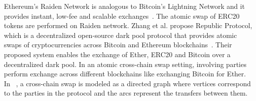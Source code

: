 Ethereum’s Raiden Network is analogous to Bitcoin’s Lightning Network and it provides instant, low-fee and scalable exchanges~\cite{Raiden}. The atomic swap of ERC20 tokens are performed on Raiden network.%
Zhang et al. propose Republic Protocol, which is a decentralized open-source dark pool protocol that provides atomic swaps of cryptocurrencies across Bitcoin and Ethereum blockchains~\cite{zhang2017republic}.%
Their proposed system enables the exchange of Ether, ERC20 and Bitcoin over a decentralized dark pool. %
In an atomic cross-chain swap setting, involving parties perform exchange across different blockchains like exchanging Bitcoin for Ether. In ~\cite{herlihy2018atomic}, a cross-chain swap is modeled as a directed graph where vertices correspond to the parties in the protocol and the arcs represent the transfers between them.

%

